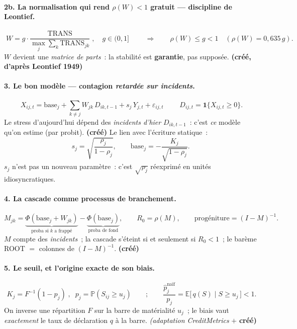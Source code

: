 \documentclass[11pt,a4paper]{article}
\newcommand{\Y}{Y}
\newcommand{\eps}{\varepsilon}
\begin{document}
\paragraph{2b. La normalisation qui rend $\rho(W)<1$ gratuit --- discipline de Leontief.}
\begin{equation}
\boxed{\;W = g\cdot\dfrac{\mathrm{TRANS}}{\max_j \sum_k \mathrm{TRANS}_{jk}}\;,\quad g\in(0,1]\;}
\qquad\Longrightarrow\qquad \rho(W) \le g < 1 \quad (\rho(W)=0{,}635\,g).
\end{equation}
$W$ devient une \emph{matrice de parts}~: la stabilité est \textbf{garantie}, pas supposée.
\textbf{(créé, d'après Leontief 1949)}

\paragraph{3. Le bon modèle --- contagion \emph{retardée sur incidents}.}
\begin{equation}
\boxed{\;X_{ij,t} = \text{base}_j + \sum_{k\neq j} W_{jk}\,D_{ik,t-1} + s_j\,\Y_{j,t} + \eps_{ij,t}\;}
\qquad D_{ij,t} = \mathbf 1\{X_{ij,t}\ge 0\}.
\end{equation}
Le stress d'aujourd'hui dépend des \emph{incidents d'hier} $D_{ik,t-1}$~: c'est \emph{ce}
modèle qu'on estime (par probit). \textbf{(créé)} Le lien avec l'écriture statique~:
\begin{equation}
s_j = \sqrt{\dfrac{\rho_j}{1-\rho_j}}, \qquad \text{base}_j = -\dfrac{K_j}{\sqrt{1-\rho_j}}.
\end{equation}
$s_j$ n'est pas un nouveau paramètre~: c'est $\sqrt{\rho_j}$ réexprimé en unités
idiosyncratiques.

\paragraph{4. La cascade comme processus de branchement.}
\begin{equation}
M_{jk} = \underbrace{\Phi(\text{base}_j + W_{jk})}_{\text{proba si } k \text{ a frappé}}
       - \underbrace{\Phi(\text{base}_j)}_{\text{proba de fond}}, \qquad
R_0 = \rho(M), \qquad \text{progéniture} = (I-M)^{-1}.
\end{equation}
$M$ compte des \emph{incidents}~; la cascade s'éteint si et seulement si $R_0<1$~; le barème
ROOT $=$ colonnes de $(I-M)^{-1}$. \textbf{(créé)}

\paragraph{5. Le seuil, et l'origine exacte de son biais.}
\begin{equation}
\boxed{\;K_j = F^{-1}(1-p_j)\;}, \;\; p_j = \mathbb P(S_{ij}\ge u_j)
\qquad ; \qquad
\frac{\hat p_j^{\text{naïf}}}{p_j} = \mathbb E\big[\,q(S)\mid S\ge u_j\,\big] < 1.
\end{equation}
On inverse une répartition $F$ sur la barre de matérialité $u_j$~; le biais vaut \emph{exactement}
le taux de déclaration $q$ à la barre. \emph{(adaptation CreditMetrics} $+$ \textbf{créé)}
\end{document}
